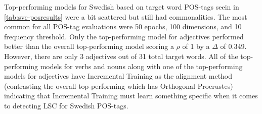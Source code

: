 Top-performing models for Swedish based on target word POS-tags seein in \autoref{tab:sve-posresults} were a bit scattered but still had commonalities. The most common for all POS-tag evaluations were 50 epochs, 100 dimensions, and 10 frequency threshold. Only the top-performing model for adjectives performed better than the overall top-performing model scoring a $\rho$ of 1 by a $\Delta$ of 0.349. However, there are only 3 adjectives out of 31 total target words. All of the top-performing models for verbs and nouns along with one of the top-performing models for adjectives have Incremental Training as the alignment method (contrasting the overall top-performing which has Orthogonal Procrustes) indicating that Incremental Training must learn something specific when it comes to detecting LSC for Swedish POS-tags. 


